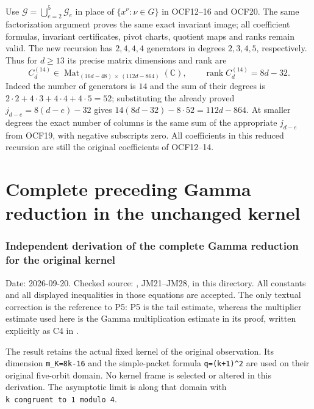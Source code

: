 \documentclass[11pt]{article}
\begin{document}
Use $\mathcal G=\bigcup_{e=2}^5\mathcal G_e$ in place of
$\{x^\nu:\nu\in G\}$ in OCF12--16 and OCF20. The same
factorization argument proves the same exact invariant image;
all coefficient formulas, invariant certificates, pivot charts,
quotient maps and ranks remain valid. The new recursion has
$2,4,4,4$ generators in degrees $2,3,4,5$, respectively. Thus
for $d\geq13$ its precise matrix dimensions and rank are
\[
 C_d^{(14)}\in
 \operatorname{Mat}_{(16d-48)\,\times\,(112d-864)}(\mathbb C),
 \qquad \operatorname{rank}C_d^{(14)}=8d-32.
 \tag{OCF26}
\]
Indeed the number of generators is $14$ and the sum of their
degrees is $2\cdot2+4\cdot3+4\cdot4+4\cdot5=52$; substituting
the already proved $j_{d-e}=8(d-e)-32$ gives
$14(8d-32)-8\cdot52=112d-864$. At smaller degrees the exact
number of columns is the same sum of the appropriate $j_{d-e}$
from OCF19, with negative subscripts zero. All coefficients
in this reduced recursion are still the original coefficients
of OCF12--14.

\endgroup

\clearpage\begingroup
\part*{Complete preceding Gamma reduction in the unchanged kernel}
\providecommand{\mrkgtightlist}{\setlength{\itemsep}{0pt}\setlength{\parskip}{0pt}}

\section{Independent derivation of the complete Gamma reduction for the original kernel}\label{mrkg:independent-derivation-of-the-complete-gamma-reduction-for-the-original-kernel}

Date: 2026-09-20. Checked source: , JM21--JM28, in this directory. All constants and all displayed inequalities in those equations are accepted. The only textual correction is the reference to P5: P5 is the tail estimate, whereas the multiplier estimate used here is the Gamma multiplication estimate in its proof, written explicitly as C4 in .

The result retains the actual fixed kernel of the original observation. Its dimension \texttt{m\_K=8k-16} and the simple-packet formula \texttt{q=(k+1)\^{}2} are used on their original five-orbit domain. No kernel frame is selected or altered in this derivation. The asymptotic limit is along that domain with \texttt{k\ congruent\ to\ 1\ modulo\ 4}.
\end{document}
